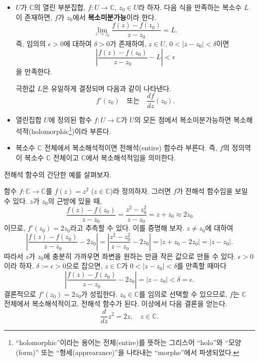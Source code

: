 \begin{saltdefinition} {}{}\label{def-2-1}

\begin{itemize}
\item[(1)] $U$가 $\mathbb C$의 열린 부분집합, $f: U\to \mathbb C$, $z_0\in U$라 하자.
다음 식을 만족하는 복소수 $L$이 존재하면, $f$가 $z_0$에서 {\bf 복소미분가능}이라 한다.
\[
\lim_{z\to z_0} \dfrac{f(z) - f(z_0)}{z - z_0} = L.
\]
즉, 임의의 $\epsilon>0$에 대하여 $\delta>0$가 존재하여,
$z\in U$, $0<|z-z_0|<\delta$이면 
\[
\left| \dfrac{f(z) - f(z_0)}{z - z_0} - L\right| < \epsilon
\]
을 만족한다.

극한값  $L$은 유일하게 결정되며 다음과 같이 나타낸다.
\[
f'(z_0) \quad\text{또는}\quad \dfrac{df}{dz}(z_0).
\]

\item[(2)] 열린집합 $U$에 정의된 함수 $f:U\to\mathbb C$가 $U$의 모든 점에서
복소미분가능하면 복소해석적(holomorphic\footnote{
``holomorphic''이라는 용어는 전체(entire)를 뜻하는 그리스어 ``holo''와
``모양(form)'' 또는 ``형세(apprearance)''을 나타내는 ``morphe''에서 파생되었다.
})이라 부른다.
\item[(3)] 복소수 $\mathbb C$ 전체에서 복소해석적이면 
전해석(entire) 함수라 부른다. 즉, $f$의 정의역이 복소수 $\mathbb C$ 전체이고
$\mathbb C$에서 복소해석적임을 의미한다.
\end{itemize}
\end{saltdefinition}

전해석 함수의 간단한 예를 살펴보자.

\begin{saltexample}{}{} \label{example-2-1}
함수 $f:\mathbb C \to \mathbb C$를 $f(z) = z^2$ ($z\in\mathbb C$)라 정의하자.
그러면 $f$가 전해석 함수임을 보일 수 있다.
$z$가 $z_0$의 근방에 있을 때,
\[
\dfrac{f(z) - f(z_0)}{z - z_0} = \dfrac{z^2 - z_0^2}{z-z_0} = z + z_0 
\approx 2z_0
\]
이므로, $f'(z_0) = 2z_0$라고 추측할 수 있다.
이를 증명해 보자.
$z\ne z_0$에 대하여
\[
\left| \dfrac{f(z) - f(z_0)}{z - z_0} - 2z_0 \right|
= \left| \dfrac{z^2 - z_0^2}{z-z_0} - 2z_0 \right| 
= |z+z_0-2z_0| = |z-z_0|.
\]
따라서 $z$가 $z_0$에 충분히 가까우면
좌변을 원하는 만큼 작은 값으로 만들 수 있다.
$\epsilon>0$이라 하자.
$\delta:=\epsilon>0$으로 잡으면,
$z\in\mathbb C$가 $0<|z-z_0| <\delta$를 만족할 때마다
\[
\left| \dfrac{f(z) - f(z_0)}{z - z_0} - 2z_0 \right|
= |z-z_0| <\delta = \epsilon.
\]
결론적으로 $f'(z_0) = 2z_0$가 성립한다.
$z_0\in\mathbb C$를 임의로 선택할 수 있으므로,
$f$는 $\mathbb C$ 전체에서 복소해석적이고,
전해석 함수가 된다. 이상에서 다음 결론을 얻는다.
\[
\dfrac{d}{dz} z^2 = 2z, \quad z\in \mathbb C.
\]
\end{saltexample}

